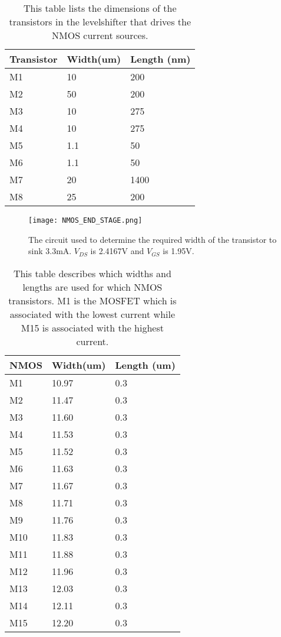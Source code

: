 \begin{appendices}
\begin{table}[h!]
\caption{This table lists the dimensions of the transistors in the levelshifter that drives the NMOS current sources.}
\begin{tabular}{l||l|l}\arraybackslash
Transistor & Width(um) & Length (nm) \\\hline\hline
M1 & 10 & 200\\\hline
M2 & 50 & 200\\\hline
M3 & 10 & 275\\\hline
M4 & 10 & 275\\\hline
M5 & 1.1 & 50\\\hline
M6 & 1.1 & 50\\\hline
M7 & 20 & 1400\\\hline
M8 & 25 & 200
\end{tabular}
\label{Tab:Levelshifter_NMOS_sizes}
\end{table}

\begin{figure}[h]
\begin{center}
\texttt{[image: NMOS\_END\_STAGE.png]}
\caption{The circuit used to determine the required width of the transistor to sink 3.3mA. $V_{DS}$ is 2.4167V and $V_{GS}$ is 1.95V.}
\label{fig:NMOS_Width_Sweep}
\end{center}
\end{figure}

\begin{table}[h!]
\caption{This table describes which widths and lengths are used for which NMOS transistors. M1 is the MOSFET which is associated with the lowest current while M15 is associated with the highest current.}
\begin{tabular}{l||l|l}\arraybackslash
NMOS & Width(um) & Length (um) \\\hline\hline
M1 & 10.97 & 0.3\\\hline
M2 & 11.47 & 0.3\\\hline
M3 & 11.60 & 0.3\\\hline
M4 &  11.53 & 0.3\\\hline
M5 & 11.52 & 0.3\\\hline
M6 & 11.63 & 0.3\\\hline
M7 & 11.67 & 0.3\\\hline
M8 & 11.71 & 0.3\\\hline
M9 & 11.76 & 0.3\\\hline
M10 & 11.83 & 0.3\\\hline
M11 & 11.88 & 0.3\\\hline
M12 & 11.96 & 0.3\\\hline
M13 & 12.03 & 0.3\\\hline
M14 & 12.11 & 0.3\\\hline
M15 & 12.20 & 0.3
\end{tabular}
\label{Tab:NMOS}
\end{table}


\end{appendices}
